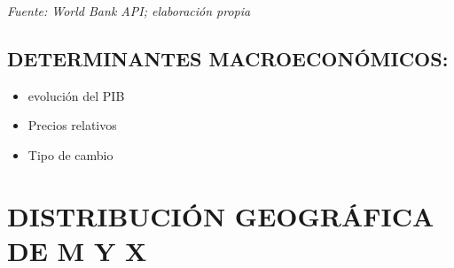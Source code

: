 \documentclass[12pt]{book}
\providecommand{\tightlist}{%
      \setlength{\itemsep}{0pt}\setlength{\parskip}{0pt}}
\begin{document}
    \emph{Fuente: World Bank API; elaboración propia}

    \section{DETERMINANTES
MACROECONÓMICOS:}\label{determinantes-macroeconuxf3micos}

\begin{itemize}
\tightlist
\item
  evolución del PIB
\item
  Precios relativos
\item
  Tipo de cambio
\end{itemize}

\chapter{DISTRIBUCIÓN GEOGRÁFICA DE M Y
X}\label{distribuciuxf3n-geogruxe1fica-de-m-y-x}
\end{document}
